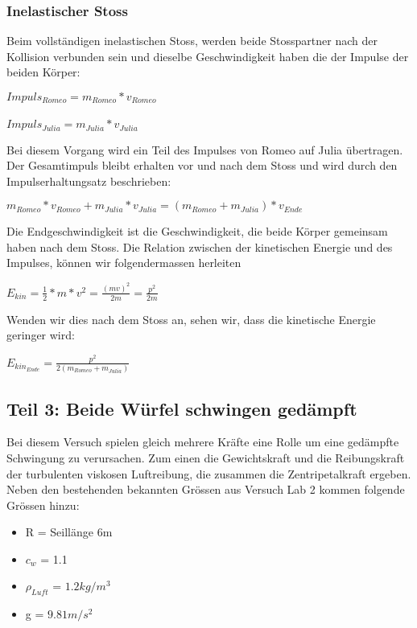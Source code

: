 \documentclass[../main.tex]{subfiles}
\begin{document}
\subsubsection{Inelastischer Stoss}
Beim vollständigen inelastischen Stoss, werden beide Stosspartner nach der Kollision verbunden sein und dieselbe
Geschwindigkeit haben %
die der Impulse der beiden Körper:
\begin{mdframed}
$Impuls_{Romeo} = m_{Romeo}*v_{Romeo}$\\\\
$Impuls_{Julia} = m_{Julia}*v_{Julia}$
\end{mdframed}
 Bei diesem Vorgang wird ein Teil des Impulses von Romeo auf Julia übertragen. Der Gesamtimpuls bleibt erhalten vor
 und nach dem Stoss und wird durch den Impulserhaltungsatz beschrieben:%
\begin{mdframed}
$ m_{Romeo}*v_{Romeo} +  m_{Julia}*v_{Julia} = (m_{Romeo} + m_{Julia})*v_{Ende}$
\end{mdframed}
Die Endgeschwindigkeit ist die Geschwindigkeit, die beide Körper gemeinsam haben nach dem Stoss.\newline
Die Relation zwischen der kinetischen Energie und des Impulses, können wir folgendermassen
herleiten %
\begin{mdframed}
$E_{kin}=\frac{1}{2} * m * v^{2} = \frac{(mv)^{2}}{2m} = \frac{p^{2}}{2m}$
\end{mdframed}
Wenden wir dies nach dem Stoss an, sehen wir, dass die kinetische Energie geringer wird:
\begin{mdframed}
$E_{kin_{Ende}}=\frac{p^{2}}{2(m_{Romeo} + m_{Julia})} $
\end{mdframed}

\subsection{Teil 3: Beide Würfel schwingen gedämpft}
Bei diesem Versuch spielen gleich mehrere Kräfte eine Rolle um eine gedämpfte Schwingung zu verursachen. Zum einen die Gewichtskraft und die Reibungskraft der turbulenten viskosen Luftreibung, die zusammen die Zentripetalkraft ergeben.
Neben den bestehenden bekannten Grössen aus Versuch Lab 2 kommen folgende Grössen hinzu:
\begin{itemize}
	\item R = Seillänge 6m
	\item $c_w$ = 1.1
	\item $\rho_{Luft}$ = $1.2kg/m^3$
	\item g = $9.81 m/s^2$
	
\end{itemize}
\end{document}

